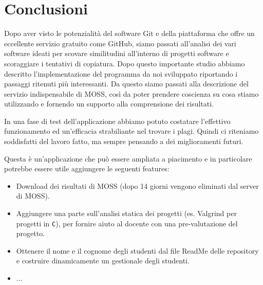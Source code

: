 \chapter{Conclusioni}
	Dopo aver visto le potenzialità del software Git e della piattaforma che offre un eccellente servizio gratuito come GitHub, siamo passati all'analisi dei vari software ideati per scovare similitudini all'interno di progetti software e scoraggiare i tentativi di copiatura.
	Dopo questo importante studio abbiamo descritto l'implementazione del programma da noi sviluppato riportando i passaggi ritenuti più interessanti. Da questo siamo passati alla descrizione del servizio indispensabile di MOSS, così da poter prendere coscienza su cosa stiamo utilizzando e fornendo un supporto alla comprensione dei risultati.
	
	In una fase di test dell'applicazione abbiamo potuto costatare l'effettivo funzionamento ed un'efficacia strabiliante nel trovare i plagi. Quindi ci riteniamo soddisfatti del lavoro fatto, ma sempre pensando a dei miglioramenti futuri.
	
	Questa è un'applicazione che può essere ampliata a piacimento e in particolare potrebbe essere utile aggiungere le seguenti features:
	\begin{itemize}
		\item Download dei risultati di MOSS (dopo 14 giorni vengono eliminati dal server di MOSS).
		\item Aggiungere una parte sull'analisi statica dei progetti (es. Valgrind per progetti in \verb|C|), per fornire aiuto al docente con una pre-valutazione del progetto.
		\item Ottenere il nome e il cognome degli studenti dal file ReadMe delle repository e costruire dinamicamente un gestionale degli studenti.
		\item ...
	\end{itemize}